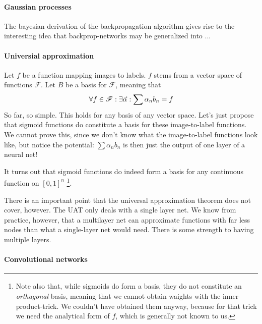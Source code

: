 \paragraph{Gaussian processes}

The bayesian derivation of the backpropagation algorithm gives rise to the interesting idea that backprop-networks may be generalized into ...


\paragraph{Universial approximation}
Let $f$ be a function mapping images to labels. $f$ stems from a vector space of functions $\mathscr{F}$. Let $B$ be a basis for $\mathscr{F}$, meaning that 
$$ \forall f \in \mathscr{F}: \exists \vec{\alpha}: \sum \alpha_n b_n = f $$
So far, so simple. This holds for any basis of any vector space. Let's just propose that sigmoid functions do constitute a basis for these image-to-label functions. We cannot prove this, since we don't know what the image-to-label functions look like, but notice the potential: 
$ \sum \alpha_n b_n $ is then just the output of one layer of a neural net!

It turns out that sigmoid functions do indeed form a basis for any continuous function on $[0,1]^n$ \footnote{Note also that, while sigmoids do form a basis, they do not constitute an \emph{orthagonal} basis, meaning that we cannot obtain waights with the inner-product-trick. We couldn't have obtained them anyway, because for that trick we need the analytical form of $f$, which is generally not known to us.}.

There is an important point that the universal approximation theorem does not cover, however. The UAT only deals with a single layer net. We know from practice, however, that a multilayer net can approximate functions with far less nodes than what a single-layer net would need. There is some strength to having multiple layers.


\paragraph{Convolutional networks}

